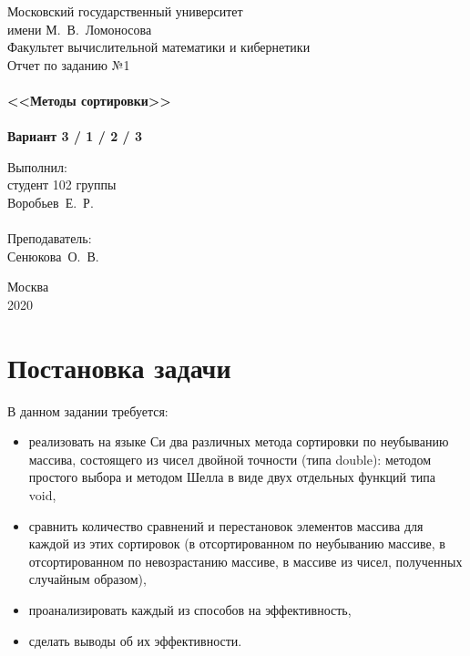 \documentclass[a4paper,12pt,titlepage,finall]{article}
\begin{document}
\begin{titlepage}
    \begin{center}
	{\small \sc Московский государственный университет \\имени М.~В.~Ломоносова\\
	Факультет вычислительной математики и кибернетики\\}
	\vfill
	{\Large \sc Отчет по заданию №1}\\
	~\\
	{\large \bf <<Методы сортировки>>}\\
	~\\
	{\large \bf Вариант 3 / 1 / 2 / 3}
    \end{center}
    \begin{flushright}
	\vfill {Выполнил:\\
	студент 102 группы\\
	Воробьев~Е.~Р.\\
	~\\
	Преподаватель:\\
	Сенюкова~О.~В.}
    \end{flushright}
    \begin{center}
	\vfill
	{\small Москва\\2020}
    \end{center}
\end{titlepage}

\tableofcontents
\newpage

\section{Постановка задачи}

В данном задании требуется:
\begin{itemize}
\item реализовать на языке Си два различных метода сортировки по неубыванию массива, состоящего из чисел двойной точности (типа double): методом простого выбора и методом Шелла в виде двух отдельных функций типа void,
\item сравнить количество сравнений и перестановок элементов массива для каждой из этих сортировок (в отсортированном по неубыванию массиве, в отсортированном по невозрастанию массиве, в массиве из чисел, полученных случайным образом),
\item проанализировать каждый из способов на эффективность,
\item сделать выводы об их эффективности.
\end{itemize}
\end{document}
